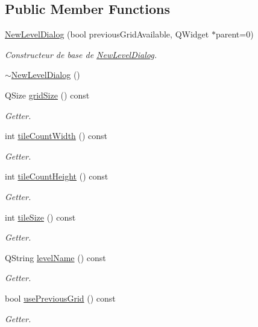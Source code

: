 \subsection*{Public Member Functions}
\begin{DoxyCompactItemize}
\item 
\hyperlink{class_new_level_dialog_ad177ac13535e71bc671a0c04f0464854}{New\+Level\+Dialog} (bool previous\+Grid\+Available, Q\+Widget $\ast$parent=0)
\begin{DoxyCompactList}\small\item\em Constructeur de base de \hyperlink{class_new_level_dialog}{New\+Level\+Dialog}. \end{DoxyCompactList}\item 
\hyperlink{class_new_level_dialog_abb85c197f87a69f2faae637bb5247897}{$\sim$\+New\+Level\+Dialog} ()
\item 
Q\+Size \hyperlink{class_new_level_dialog_a5ca7d9a32d6afb209dc63c12836de28d}{grid\+Size} () const 
\begin{DoxyCompactList}\small\item\em Getter. \end{DoxyCompactList}\item 
int \hyperlink{class_new_level_dialog_a719c671d7b868e298b07471afba279ea}{tile\+Count\+Width} () const 
\begin{DoxyCompactList}\small\item\em Getter. \end{DoxyCompactList}\item 
int \hyperlink{class_new_level_dialog_a0144b7e9d62d1d3e51f59801e7e20f3e}{tile\+Count\+Height} () const 
\begin{DoxyCompactList}\small\item\em Getter. \end{DoxyCompactList}\item 
int \hyperlink{class_new_level_dialog_a1f7bb6871337ead5bdd8bdbfca292aea}{tile\+Size} () const 
\begin{DoxyCompactList}\small\item\em Getter. \end{DoxyCompactList}\item 
Q\+String \hyperlink{class_new_level_dialog_ae155692ae9fa604ac0955d9d2882afd0}{level\+Name} () const 
\begin{DoxyCompactList}\small\item\em Getter. \end{DoxyCompactList}\item 
bool \hyperlink{class_new_level_dialog_a35dc3afda2c0d098e982daa400fc0876}{use\+Previous\+Grid} () const 
\begin{DoxyCompactList}\small\item\em Getter. \end{DoxyCompactList}\end{DoxyCompactItemize}


